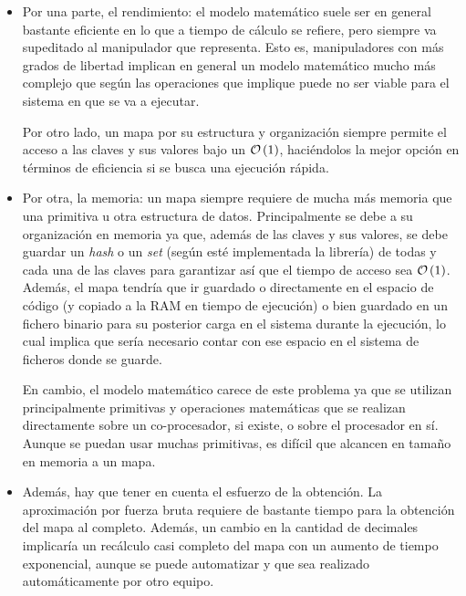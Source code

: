 \begin{itemize}
    \item Por una parte, el rendimiento: el modelo matemático suele ser en general
          bastante eficiente en lo que a tiempo de cálculo se refiere, pero siempre va
          supeditado al manipulador que representa. Esto es, manipuladores con más
          grados de libertad implican en general un modelo matemático mucho más complejo que según
          las operaciones que implique puede no ser viable para el sistema en que se va a ejecutar.

          Por otro lado, un mapa por su estructura y organización siempre permite el acceso a las
          claves y sus valores bajo un $\bigO{1}$, haciéndolos la mejor opción en términos
          de eficiencia si se busca una ejecución rápida.

    \item Por otra, la memoria: un mapa siempre requiere de mucha más memoria que
          una primitiva u otra estructura de datos. Principalmente se debe a su organización
          en memoria ya que, además de las claves y sus valores, se debe guardar un \textit{hash}
          o un \textit{set} (según esté implementada la librería) de todas y cada una de las
          claves para garantizar así que el tiempo de acceso sea $\bigO{1}$.
          Además, el mapa tendría que ir guardado o directamente en el espacio de código
          (y copiado a la \ac{RAM} en tiempo de ejecución) o bien guardado en un fichero
          binario para su posterior carga en el sistema durante la ejecución, lo cual implica
          que sería necesario contar con ese espacio en el sistema de ficheros donde se guarde.

          En cambio, el modelo matemático carece de este problema ya que se utilizan
          principalmente primitivas y operaciones matemáticas que se realizan directamente
          sobre un co-procesador, si existe, o sobre el procesador en sí. Aunque se puedan
          usar muchas primitivas, es difícil que alcancen en tamaño en memoria a un mapa.

    \item Además, hay que tener en cuenta el esfuerzo de la obtención. La aproximación
          por fuerza bruta requiere de bastante tiempo para la obtención del mapa al completo.
          Además, un cambio en la cantidad de decimales implicaría un recálculo casi completo del mapa
          con un aumento de tiempo exponencial, aunque se puede automatizar y que sea realizado
          automáticamente por otro equipo.


\end{itemize}
